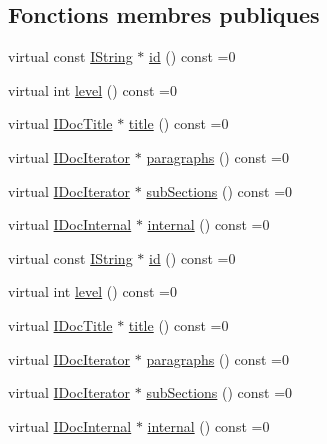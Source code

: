 \subsection*{Fonctions membres publiques}
\begin{DoxyCompactItemize}
\item 
virtual const \hyperlink{class_i_string}{I\+String} $\ast$ \hyperlink{class_i_doc_section_a181e17e9db9de7f88536aa2ce7d8de09}{id} () const  =0
\item 
virtual int \hyperlink{class_i_doc_section_a8cf658a232a0bea0d1ef6da12d32d9e3}{level} () const  =0
\item 
virtual \hyperlink{class_i_doc_title}{I\+Doc\+Title} $\ast$ \hyperlink{class_i_doc_section_ae5cda707fe024a30e2426e03db9e45e2}{title} () const  =0
\item 
virtual \hyperlink{class_i_doc_iterator}{I\+Doc\+Iterator} $\ast$ \hyperlink{class_i_doc_section_a1f64fd0ee6e9f0a0ba54d3359a608128}{paragraphs} () const  =0
\item 
virtual \hyperlink{class_i_doc_iterator}{I\+Doc\+Iterator} $\ast$ \hyperlink{class_i_doc_section_a075cbef900b938227272f570ce839700}{sub\+Sections} () const  =0
\item 
virtual \hyperlink{class_i_doc_internal}{I\+Doc\+Internal} $\ast$ \hyperlink{class_i_doc_section_abaf336a86ea959dabda3d532a4d3407a}{internal} () const  =0
\item 
virtual const \hyperlink{class_i_string}{I\+String} $\ast$ \hyperlink{class_i_doc_section_a181e17e9db9de7f88536aa2ce7d8de09}{id} () const  =0
\item 
virtual int \hyperlink{class_i_doc_section_a8cf658a232a0bea0d1ef6da12d32d9e3}{level} () const  =0
\item 
virtual \hyperlink{class_i_doc_title}{I\+Doc\+Title} $\ast$ \hyperlink{class_i_doc_section_ae5cda707fe024a30e2426e03db9e45e2}{title} () const  =0
\item 
virtual \hyperlink{class_i_doc_iterator}{I\+Doc\+Iterator} $\ast$ \hyperlink{class_i_doc_section_a1f64fd0ee6e9f0a0ba54d3359a608128}{paragraphs} () const  =0
\item 
virtual \hyperlink{class_i_doc_iterator}{I\+Doc\+Iterator} $\ast$ \hyperlink{class_i_doc_section_a075cbef900b938227272f570ce839700}{sub\+Sections} () const  =0
\item 
virtual \hyperlink{class_i_doc_internal}{I\+Doc\+Internal} $\ast$ \hyperlink{class_i_doc_section_abaf336a86ea959dabda3d532a4d3407a}{internal} () const  =0
\end{DoxyCompactItemize}
